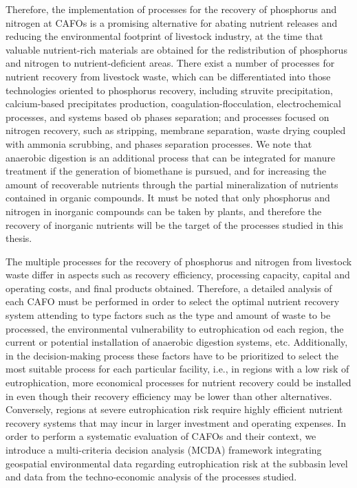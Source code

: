 \begin{refsection}[referencesCh1]
Therefore, the implementation of processes for the recovery of phosphorus and nitrogen at CAFOs is a promising alternative for abating nutrient releases and reducing the environmental footprint of livestock industry, at the time that valuable nutrient-rich materials are obtained for the redistribution of phosphorus and nitrogen to nutrient-deficient areas. There exist a number of processes for nutrient recovery from livestock waste, which can be differentiated into those technologies oriented to phosphorus recovery, including struvite precipitation, calcium-based precipitates production, coagulation-flocculation, electrochemical processes, and systems based ob phases separation; and processes focused on nitrogen recovery, such as stripping, membrane separation, waste drying coupled with ammonia scrubbing, and phases separation processes. We note that anaerobic digestion is an additional process that can be integrated for manure treatment if the generation of biomethane is pursued, and for increasing the amount of recoverable nutrients through the partial mineralization of nutrients contained in organic compounds. It must be noted that only phosphorus and nitrogen in inorganic compounds can be taken by plants, and therefore the recovery of inorganic nutrients will be the target of the processes studied in this thesis.

The multiple processes for the recovery of phosphorus and nitrogen from livestock waste differ in aspects such as recovery efficiency, processing capacity, capital and operating costs, and final products obtained. Therefore, a detailed analysis of each CAFO must be performed in order to select the optimal nutrient recovery system attending to type factors such as the type and amount of waste to be processed, the environmental vulnerability to eutrophication od each region, the current or potential installation of anaerobic digestion systems, etc. Additionally, in the decision-making process these factors have to be prioritized to select the most suitable process for each particular facility, i.e., in regions with a low risk of eutrophication, more economical processes for nutrient recovery could be installed in even though their recovery efficiency may be lower than other alternatives. Conversely, regions at severe eutrophication risk require highly efficient nutrient recovery systems that may incur in larger investment and operating expenses. In order to perform a systematic evaluation of CAFOs and their context, we introduce a multi-criteria decision analysis (MCDA) framework integrating geospatial environmental data regarding eutrophication risk at the subbasin level and data from the techno-economic analysis of the processes studied. 


\end{refsection}
